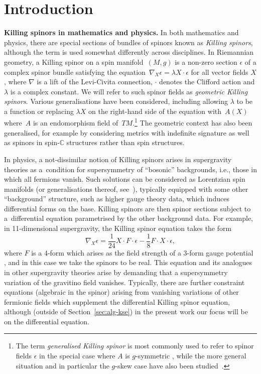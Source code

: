 \documentclass[pdftex]{sigma}
\numberwithin{equation}{section}
\newcommand{\1}{\mathbbm{1}}
\begin{document}

\tableofcontents

\section{Introduction}
\label{sec:intro}

{\bf Killing spinors in mathematics and physics.}
In both mathematics and physics, there are special sections of bundles of spinors known as \emph{Killing spinors}, although the term is used somewhat differently across disciplines. In Riemannian geometry, a Killing spinor on a spin manifold~$(M,g)$ is a non-zero section $\epsilon$ of a complex spinor bundle satisfying the equation~${\nabla_{\!X} \epsilon = \lambda X\!\cdot \epsilon
}$
for all vector fields $X$, where $\nabla$ is a lift of the Levi-Civita connection, $\cdot$ denotes the Clifford action and $\lambda$ is a complex constant. We will refer to such spinor fields as \emph{geometric Killing spinors}. Various generalisations have been considered, including allowing $\lambda$ to be a function \cite{Lichnerowicz1987} or replacing $\lambda X$ on the right-hand side of the equation with~$A(X)$ where~$A$ is an endomorphism field of~$TM$.\footnote{The term \emph{generalised Killing spinor} is most commonly used to refer to spinor fields $\epsilon$ in the special case where $A$ is $g$-symmetric \cite{Bar2005,Moroianu2014}, while the more general situation and in particular the $g$-skew case have also been studied~\cite{Habib2012}.}
The geometric context has also been generalised, for example by considering metrics with indefinite signature \cite{Bohle2003} as well as spinors in spin-$\mathbb{C}$ structures \cite{Moroianu1997} rather than spin structures.

In physics, a not-dissimilar notion of Killing spinors arises in supergravity theories as a~condition for supersymmetry of ``bosonic'' backgrounds, i.e., those in which all fermions vanish. Such solutions can be considered as Lorentzian spin manifolds (or generalisations thereof, see~\cite{Lazaroiu2019,Lazaroiu2019_1}), typically equipped with some other ``background'' structure, such as higher gauge theory data, which induces differential forms on the base. Killing spinors are then spinor sections subject to a~differential equation parametrised by the other background data. For example, in 11-dimensional supergravity, the Killing spinor equation takes the form
\[%
 \nabla_X \epsilon = \frac{1}{24}X \cdot F \cdot \epsilon - \frac{1}{8}F \cdot X \cdot \epsilon,
\]
where $F$ is a 4-form which arises as the field strength of a 3-form gauge potential \cite{Pakis2003}, and in this case we take the spinors to be real. This equation and its analogues in other supergravity theories arise by demanding that a supersymmetry variation of the gravitino field vanishes. Typically, there are further constraint equations (algebraic in the spinor) arising from vanishing variations of other fermionic fields which supplement the differential Killing spinor equation, although (outside of Section~\ref{sec:alg-kse}) in the present work our focus will be on the differential equation.
\end{document}
